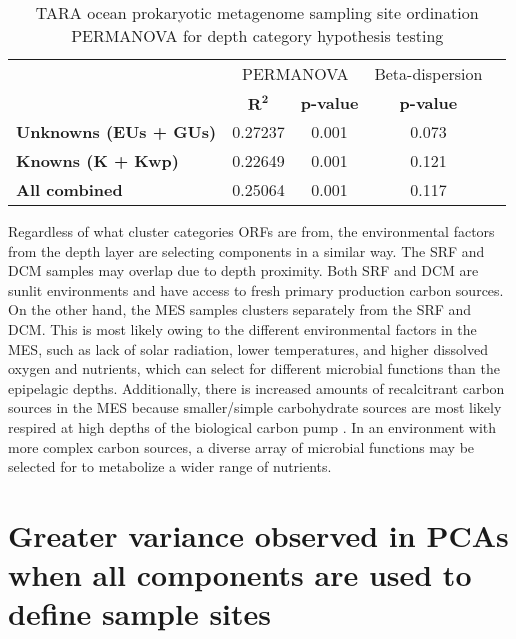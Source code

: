 \begin{table}[]
\centering
\caption{TARA ocean prokaryotic metagenome sampling site ordination PERMANOVA for depth category hypothesis testing}
\label{table:3.2}
\begin{tabular}{@{}lcccc@{}}
\cmidrule[\heavyrulewidth](l){2-4}
                              & \multicolumn{2}{c}{PERMANOVA}  & \multicolumn{1}{c}{Beta-dispersion} \\ \cmidrule(l){2-4}
                              & {$\bm{R^2}$} & \textbf{p-value}    & \textbf{p-value}    \\ \midrule
\textbf{Unknowns (EUs + GUs)} & 0.27237         & 0.001            & 0.073                            \\
\textbf{Knowns (K + Kwp)}     & 0.22649         & 0.001            & 0.121                            \\
\textbf{All combined}         & 0.25064         & 0.001            & 0.117                            \\ \bottomrule
\end{tabular}
\end{table}

Regardless of what cluster categories ORFs are from, the environmental factors from the depth layer are selecting components in a similar way. The SRF and DCM samples may overlap due to depth proximity. Both SRF and DCM are sunlit environments and have access to fresh primary production carbon sources. On the other hand, the MES samples clusters separately from the SRF and DCM. This is most likely owing to the different environmental factors in the MES, such as lack of solar radiation, lower temperatures, and higher dissolved oxygen and nutrients, which can select for different microbial functions than the epipelagic depths. Additionally, there is increased amounts of recalcitrant carbon sources in the MES because smaller/simple carbohydrate sources are most likely respired at high depths of the biological carbon pump \citep{Azam_2007}. In an environment with more complex carbon sources, a diverse array of microbial functions may be selected for to metabolize a wider range of nutrients.\\

\section{Greater variance observed in PCAs when all components are used to define sample sites}


